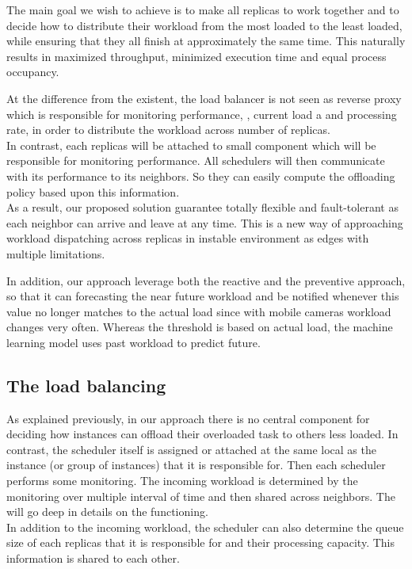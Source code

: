 The main goal we wish to achieve is to make all replicas to work together and to decide how to distribute their workload from the most loaded to the least loaded, while ensuring that they all finish at approximately the same time. This naturally results in maximized throughput, minimized execution time and equal process occupancy.

At the difference from the existent, the load balancer is not seen as reverse proxy which is responsible for monitoring performance, \eg, current load a and processing rate, in order to distribute the workload across number of replicas.\\
In contrast, each replicas will be attached to small component which will be responsible for monitoring performance. All schedulers will then communicate with its performance to its neighbors. So they can easily compute the offloading policy based upon this information.\\
As a result, our proposed solution guarantee totally flexible and fault-tolerant as each neighbor can arrive and leave at any time. This is a new way of approaching workload dispatching across replicas in instable environment as edges with multiple limitations.

In addition, our approach leverage both the reactive and the preventive approach, so that it can forecasting the near future workload and be notified whenever this value no longer matches to the actual load since with mobile cameras workload changes very often. Whereas the threshold is based on actual load, the machine learning model uses past workload to predict future.


\subsection{The load balancing}

As explained previously, in our approach there is no central component for deciding how instances can offload their overloaded task to others less loaded. In contrast, the scheduler itself is assigned or attached at the same local as the instance (or group of instances) that it is responsible for. Then each scheduler performs some monitoring. The incoming workload is determined by the monitoring over multiple interval of time and then shared across neighbors. The  will go deep in details on the functioning.\\
In addition to the incoming workload, the scheduler can also determine the queue size of each replicas that it is responsible for and their processing capacity. This information is shared to each other.


